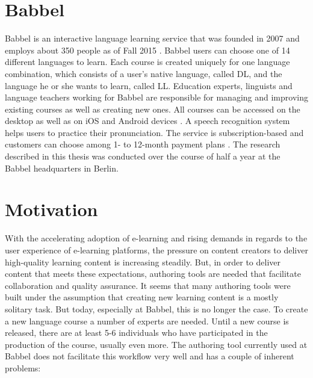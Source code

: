 \section{Babbel}
Babbel is an interactive language learning service that was founded in 2007 and employs about 350 people as of Fall 2015 \cite{_babbel_????}. Babbel users can choose one of 14 different languages to learn. Each course is created uniquely for one language combination, which consists of a user's native language, called \ac{DL}, and the language he or she wants to learn, called \ac{LL}. Education experts, linguists and language teachers working for Babbel are responsible for managing and improving existing courses as well as creating new ones. All courses can be accessed on the desktop as well as on iOS and Android devices \cite{_learn_????}. A speech recognition system helps users to practice their pronunciation. The service is subscription-based and customers can choose among 1- to 12-month payment plans \cite{_prices_????}.
The research described in this thesis was conducted over the course of half a year at the Babbel headquarters in Berlin.

\section{Motivation} %
With the accelerating adoption of e-learning and rising demands in regards to the user experience of e-learning platforms, the pressure on content creators to deliver high-quality learning content is increasing steadily. But, in order to deliver content that meets these expectations, authoring tools are needed that facilitate collaboration and quality assurance. It seems that many authoring tools were built under the assumption that creating new learning content is a mostly solitary task. But today, especially at Babbel, this is no longer the case. To create a new language course a number of experts are needed. Until a new course is released, there are at least 5-6 individuals who have participated in the production of the course, usually even more. The authoring tool currently used at Babbel does not facilitate this workflow very well and has a couple of inherent problems:



